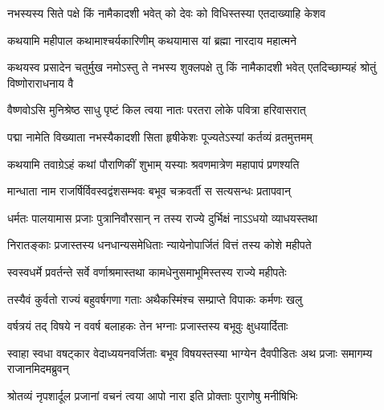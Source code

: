 \label{sec:padma-bhadrapada-shukla-padma}

\ganapatyadiDhyanam
\padmaPuranam



\twolineshloka
{नभस्यस्य सिते पक्षे किं नामैकादशी भवेत्}
{को देवः को विधिस्तस्या एतदाख्याहि केशव}%


\twolineshloka
{कथयामि महीपाल कथामाश्चर्यकारिणीम्}
{कथयामास यां ब्रह्मा नारदाय महात्मने}%


\threelineshloka
{कथयस्व प्रसादेन चतुर्मुख नमोऽस्तु ते}
{नभस्य शुक्लपक्षे तु किं नामैकादशी भवेत्}
{एतदिच्छाम्यहं श्रोतुं विष्णोराराधनाय वै}%


\twolineshloka
{वैष्णवोऽसि मुनिश्रेष्ठ साधु पृष्टं किल त्वया}
{नातः परतरा लोके पवित्रा हरिवासरात्}%

\twolineshloka
{पद्मा नामेति विख्याता नभस्यैकादशी सिता}
{हृषीकेशः पूज्यतेऽस्यां कर्तव्यं व्रतमुत्तमम्}%

\twolineshloka
{कथयामि तवाग्रेऽहं कथां पौराणिकीं शुभाम्}
{यस्याः श्रवणमात्रेण महापापं प्रणश्यति}%

\twolineshloka
{मान्धाता नाम राजर्षिर्विवस्वद्वंशसम्भवः}
{बभूव चक्रवर्ती स सत्यसन्धः प्रतापवान्}%

\twolineshloka
{धर्मतः पालयामास प्रजाः पुत्रानिवौरसान्}
{न तस्य राज्ये दुर्भिक्षं नाऽऽधयो व्याधयस्तथा}%

\twolineshloka
{निरातङ्काः प्रजास्तस्य धनधान्यसमेधिताः}
{न्यायेनोपार्जितं वित्तं तस्य कोशे महीपते}%

\twolineshloka
{स्वस्वधर्मे प्रवर्तन्ते सर्वे वर्णाश्रमास्तथा}
{कामधेनुसमाभूमिस्तस्य राज्ये महीपतेः}%

\twolineshloka
{तस्यैवं कुर्वतो राज्यं बहुवर्षगणा गताः}
{अथैकस्मिंश्च सम्प्राप्ते विपाकः कर्मणः खलु}%

\twolineshloka
{वर्षत्रयं तद् विषये न ववर्ष बलाहकः}
{तेन भग्नाः प्रजास्तस्य बभूवुः क्षुधयार्दिताः}%

\threelineshloka
{स्वाहा स्वधा वषट्कार वेदाध्ययनवर्जिताः}
{बभूव विषयस्तस्या भाग्येन दैवपीडितः}
{अथ प्रजाः समागम्य राजानमिदमब्रुवन्}%


\twolineshloka
{श्रोतव्यं नृपशार्दूल प्रजानां वचनं त्वया}
{आपो नारा इति प्रोक्ताः पुराणेषु मनीषिभिः}%

